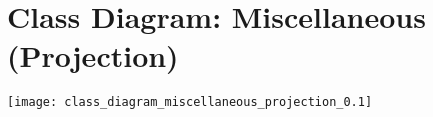 \section{Class Diagram: Miscellaneous (Projection)}
\texttt{[image: class\_diagram\_miscellaneous\_projection\_0.1]} 